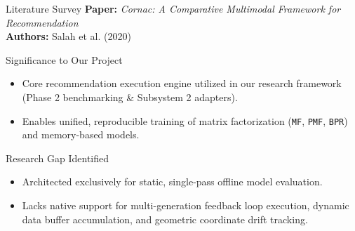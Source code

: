 \documentclass[11pt,aspectratio=43,xcolor=table]{beamer}
\begin{document}
\begin{frame}{Literature Survey}
\small
\textbf{Paper:} \emph{Cornac: A Comparative Multimodal Framework for Recommendation} \\
\textbf{Authors:} Salah et al. (2020)

\vspace{0.15cm}
\begin{block}{Significance to Our Project}
\begin{itemize}
  \item Core recommendation execution engine utilized in our research framework (Phase 2 benchmarking \& Subsystem 2 adapters).
  \item Enables unified, reproducible training of matrix factorization (\texttt{MF}, \texttt{PMF}, \texttt{BPR}) and memory-based models.
\end{itemize}
\end{block}

\vspace{0.05cm}
\begin{block}{Research Gap Identified}
\begin{itemize}
  \item Architected exclusively for static, single-pass offline model evaluation.
  \item Lacks native support for multi-generation feedback loop execution, dynamic data buffer accumulation, and geometric coordinate drift tracking.
\end{itemize}
\end{block}
\end{frame}
\end{document}
